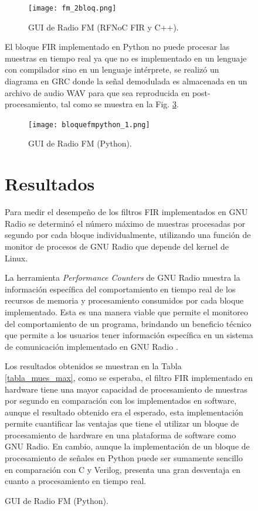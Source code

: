 \documentclass[12pt]{difu100cia} %
\begin{document}
\begin{figure}[!ht]
\begin{figure}[!ht]
	\centering
	\texttt{[image: fm\_2bloq.png]}
	\caption{GUI de Radio FM (RFNoC FIR y C++).}
	\label{bloflow_result}
\end{figure}

El bloque FIR implementado en Python no puede procesar las muestras en tiempo real ya que no es implementado en un lenguaje con compilador sino en un lenguaje intérprete, se realizó un diagrama en GRC donde la señal demodulada es almacenada en un archivo de audio WAV para que sea reproducida en post-procesamiento, tal como se muestra en la Fig. \ref{bloquefmpytho}.

\begin{figure}[!ht]
	\centering
	\texttt{[image: bloquefmpython\_1.png]}
	\caption{GUI de Radio FM (Python).}
	\label{bloquefmpytho}
\end{figure}

\section{Resultados}
\label{resultados}

Para medir el desempeño de los filtros FIR implementados en GNU Radio se determinó el número máximo de muestras procesadas por segundo por cada bloque individualmente, utilizando una función de monitor de procesos de GNU Radio que depende del kernel de Linux. 

La herramienta \textit{Performance Counters} de GNU Radio muestra la información específica del comportamiento en tiempo real de los recursos de memoria y procesamiento consumidos por cada bloque implementado. Esta es una manera viable que permite el monitoreo del comportamiento de un programa, brindando un beneficio técnico que permite a los usuarios tener información específica en un sistema de comunicación implementado en GNU Radio \cite{zitounihardware}.

Los resultados obtenidos se muestran en la Tabla \ref{tabla_mues_max}, como se esperaba, el filtro FIR implementado en hardware tiene una mayor capacidad de procesamiento de muestras por segundo en comparación con los implementados en software, aunque el resultado obtenido era el esperado, esta implementación permite cuantificar las ventajas que tiene el utilizar un bloque de procesamiento de hardware en una plataforma de software como GNU Radio. En cambio, aunque la implementación de un bloque de procesamiento de señales en Python puede ser sumamente sencillo en comparación con C y Verilog, presenta una gran desventaja en cuanto a procesamiento en tiempo real.



\end{figure}
\end{document}
